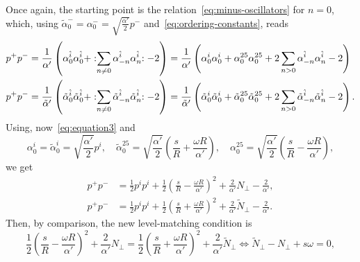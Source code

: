 \begin{mdframed}
\begin{innerproof}
    Once again, the starting point is the relation~\eqref{eq:minus-oscillators} for $n=0$, which, using $\tilde{\alpha}^-_0 = \alpha^-_0 = \sqrt{\frac{\alpha'}{2}}p^-$ and~\eqref{eq:ordering-constants}, reads
    \begin{equation*}
    \begin{aligned}
        p^+p^- &= \frac{1}{\alpha'} \left( \alpha^{\hat{i}}_0 \alpha^{\hat{i}}_0 + :\mathrel{\sum_{n \neq 0}\alpha^{\hat{i}}_{-n}\alpha^{\hat{i}}_n}: - 2 \right) = \frac{1}{\alpha'} \left( \alpha^{{i}}_0 \alpha^{{i}}_0 + \alpha^{25}_0 \alpha^{25}_0 + 2 \sum_{n>  0} \alpha^{\hat{i}}_{-n}\alpha^{\hat{i}}_n - 2 \right) \\
        p^+p^- &= \frac{1}{\tilde{\alpha}'} \left( \tilde{\alpha}^{\hat{i}}_0 \tilde{\alpha}^{\hat{i}}_0 + :\mathrel{\sum_{n \neq 0}\tilde{\alpha}^{\hat{i}}_{-n}\tilde{\alpha}^{\hat{i}}_n}: - 2 \right) = \frac{1}{\tilde{\alpha}'} \left( \tilde{\alpha}^{{i}}_0 \tilde{\alpha}^{{i}}_0 + \tilde{\alpha}^{25}_0 \tilde{\alpha}^{25}_0 + 2 \sum_{n> 0} \tilde{\alpha}^{\hat{i}}_{-n}\tilde{\alpha}^{\hat{i}}_n - 2 \right) .
    \end{aligned}
    \end{equation*}
    Using, now~\eqref{eq:equation3} and
    \begin{equation*}
        \alpha^i_0 = \tilde{\alpha}^i_0 = \sqrt{\frac{\alpha'}{2}}p^i, \quad \tilde{\alpha}^{25}_0 = \sqrt{\frac{\alpha'}{2}} \left( \frac{s}{R} + \frac{\omega R}{\alpha'} \right), \quad {\alpha}^{25}_0 = \sqrt{\frac{\alpha'}{2}} \left( \frac{s}{R} - \frac{\omega R}{\alpha'} \right), 
    \end{equation*}
    we get
    \begin{equation*}
    \begin{aligned}
        p^+p^- &= \frac{1}{2} p^i p^i + \frac{1}{2} \left( \frac{s}{R} - \frac{\omega R}{\alpha'} \right)^2 + \frac{2}{\alpha'} N_\perp - \frac{2}{\alpha'} ,\\
        p^+p^- &= \frac{1}{2} p^i p^i + \frac{1}{2} \left( \frac{s}{R} + \frac{\omega R}{\alpha'} \right)^2 + \frac{2}{\alpha'} \tilde{N}_\perp - \frac{2}{\alpha'} .
    \end{aligned}
    \end{equation*}
    Then, by comparison, the new level-matching condition is
    \begin{equation*}
        \frac{1}{2} \left( \frac{s}{R} - \frac{\omega R}{\alpha'} \right)^2 + \frac{2}{\alpha'} N_\perp = \frac{1}{2} \left( \frac{s}{R} + \frac{\omega R}{\alpha'} \right)^2 + \frac{2}{\alpha'} \tilde{N}_\perp \iff \tilde{N}_\perp - N_\perp + s \omega  = 0,

\end{equation*}
\end{innerproof}
\end{mdframed}
